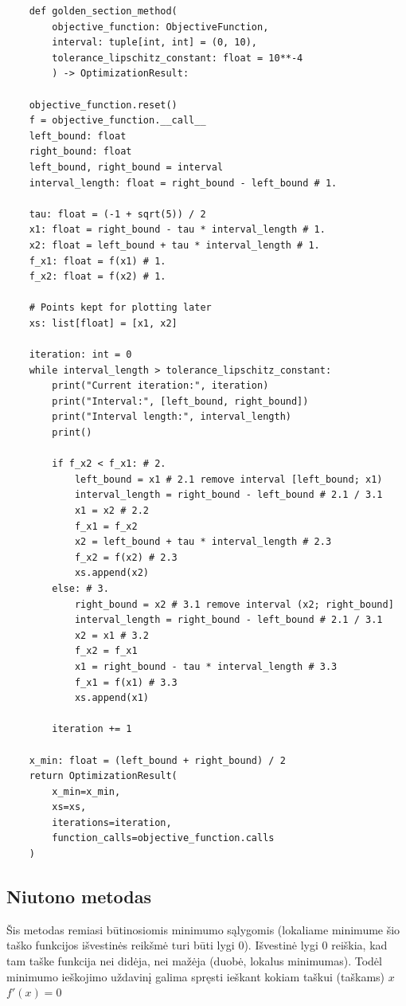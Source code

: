 \documentclass[lithuanian,a4paper,12pt]{article}
\begin{document}
\begin{verbatim}
    def golden_section_method(
        objective_function: ObjectiveFunction, 
        interval: tuple[int, int] = (0, 10), 
        tolerance_lipschitz_constant: float = 10**-4
        ) -> OptimizationResult:
    
    objective_function.reset()
    f = objective_function.__call__
    left_bound: float 
    right_bound: float 
    left_bound, right_bound = interval
    interval_length: float = right_bound - left_bound # 1.
    
    tau: float = (-1 + sqrt(5)) / 2
    x1: float = right_bound - tau * interval_length # 1.
    x2: float = left_bound + tau * interval_length # 1.
    f_x1: float = f(x1) # 1.
    f_x2: float = f(x2) # 1.

    # Points kept for plotting later
    xs: list[float] = [x1, x2]
    
    iteration: int = 0
    while interval_length > tolerance_lipschitz_constant:
        print("Current iteration:", iteration)
        print("Interval:", [left_bound, right_bound])
        print("Interval length:", interval_length)
        print()
        
        if f_x2 < f_x1: # 2.
            left_bound = x1 # 2.1 remove interval [left_bound; x1)
            interval_length = right_bound - left_bound # 2.1 / 3.1
            x1 = x2 # 2.2
            f_x1 = f_x2
            x2 = left_bound + tau * interval_length # 2.3
            f_x2 = f(x2) # 2.3
            xs.append(x2)
        else: # 3.
            right_bound = x2 # 3.1 remove interval (x2; right_bound]
            interval_length = right_bound - left_bound # 2.1 / 3.1
            x2 = x1 # 3.2
            f_x2 = f_x1
            x1 = right_bound - tau * interval_length # 3.3
            f_x1 = f(x1) # 3.3
            xs.append(x1)
            
        iteration += 1
        
    x_min: float = (left_bound + right_bound) / 2
    return OptimizationResult(
        x_min=x_min, 
        xs=xs, 
        iterations=iteration, 
        function_calls=objective_function.calls
    )
\end{verbatim}
\pagebreak

\subsection{Niutono metodas}
Šis metodas remiasi būtinosiomis minimumo sąlygomis (lokaliame minimume šio taško funkcijos išvestinės reikšmė turi būti lygi 0). Išvestinė lygi 0 reiškia, kad tam taške funkcija nei didėja, nei mažėja (duobė, lokalus minimumas). Todėl minimumo ieškojimo uždavinį galima spręsti ieškant kokiam taškui (taškams) $x$ $f'(x) = 0$
\end{document}
